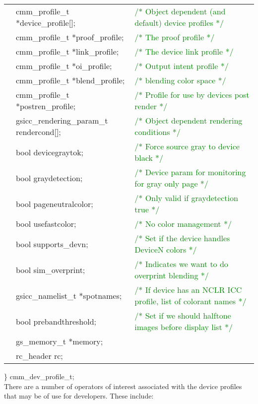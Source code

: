 \documentclass[12pt,notitlepage]{article}
\begin{document}
\begin{tabular}{lll}
 & cmm\_profile\_t  *device\_profile[]; & \textcolor{green}{/* Object dependent (and default) device profiles */}  \\
 & cmm\_profile\_t  *proof\_profile; & \textcolor{green}{/* The proof profile */}  \\
 & cmm\_profile\_t  *link\_profile; & \textcolor{green}{/* The device link profile */}  \\
 & cmm\_profile\_t  *oi\_profile; & \textcolor{green}{/* Output intent profile */}  \\
 & cmm\_profile\_t  *blend\_profile; & \textcolor{green}{/* blending color space */}  \\
 & cmm\_profile\_t  *postren\_profile; & \textcolor{green}{/* Profile for use by devices post render */}  \\
 & gsicc\_rendering\_param\_t rendercond[]; & \textcolor{green}{/* Object dependent rendering conditions */}  \\
 & bool devicegraytok;    &    \textcolor{green}{/* Force source gray to device black */}  \\
 & bool graydetection;    &    \textcolor{green}{/*  Device param for monitoring for gray only page */}  \\
 & bool pageneutralcolor;  &   \textcolor{green}{/* Only valid if graydetection true */}  \\
 & bool usefastcolor;     &   \textcolor{green}{/* No color management */} \\
 & bool supports\_devn;     &   \textcolor{green}{/* Set if the device handles DeviceN colors */} \\
 & bool sim\_overprint;  &   \textcolor{green}{/* Indicates we want to do overprint blending */} \\
 & gsicc\_namelist\_t  *spotnames; & \textcolor{green}{/* If device has an NCLR ICC profile, list of colorant names */} \\
 & bool prebandthreshold;     &   \textcolor{green}{/* Set if we should halftone images before display list */} \\
  &       gs\_memory\_t *memory;    & \\
  &       rc\_header rc; &
\end{tabular}

\noindent  \}  cmm\_dev\_profile\_t;\\

There are a number of operators of interest associated with the device profiles that may be of use for developers.  These include:\\
\end{document}
